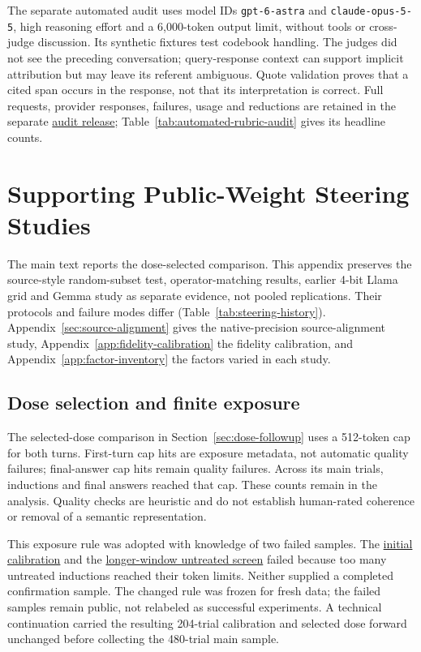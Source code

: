 \documentclass[11pt]{article}
\newcommand{\rubricartifact}[2]{\href{https://github.com/tdj28/llm_selfref_pre/blob/fdb6d15782b964b40f0be7d6528cf47d5fc0b140/#1}{#2}}
\begin{document}
The separate automated audit uses model IDs \texttt{gpt-6-astra} and
\texttt{claude-opus-5-5}, high reasoning effort and a 6,000-token output
limit, without tools or cross-judge discussion. Its \RubricAuditPilotN{}
synthetic fixtures test codebook handling. The judges did not
see the preceding conversation; query-response context can support implicit
attribution but may leave its referent ambiguous. Quote validation proves
that a cited span occurs in the response, not that its interpretation is
correct. Full requests, provider responses, failures, usage and reductions
are retained in the separate
\rubricartifact{data/automated_rubric_audit/v1_20260929/release_manifest.json}{audit release};
Table~\ref{tab:automated-rubric-audit} gives its headline counts.
\FloatBarrier

\section{Supporting Public-Weight Steering Studies}
\label{app:legacy-steering}

The main text reports the dose-selected comparison. This appendix preserves
the source-style random-subset test, operator-matching results, earlier
4-bit Llama grid and Gemma study as separate evidence, not pooled
replications. Their protocols and failure modes differ
(Table~\ref{tab:steering-history}). Appendix~\ref{sec:source-alignment}
gives the native-precision source-alignment study,
Appendix~\ref{app:fidelity-calibration} the fidelity calibration, and
Appendix~\ref{app:factor-inventory} the factors varied in each study.

\subsection{Dose selection and finite exposure}
\label{app:dose-exposure}

The selected-dose comparison in Section~\ref{sec:dose-followup} uses a
512-token cap for both turns. First-turn cap hits are exposure metadata,
not automatic quality failures; final-answer cap hits remain quality
failures. Across its \DoseMainTrials{} main trials,
\DoseFollowupInductionCaps{} inductions and \DoseFollowupFinalCaps{} final
answers reached that cap. These counts remain in the analysis. Quality
checks are heuristic and do not establish human-rated coherence or removal
of a semantic representation.

This exposure rule was adopted with knowledge of two failed samples. The
\href{https://github.com/tdj28/llm_selfref_pre/tree/d90abef11a1d3776ae2417687b56aa85e8ead5f5/data/berg_dose_ladder/calibration_v1_20261004}{initial calibration}
and the
\href{https://github.com/tdj28/llm_selfref_pre/tree/0df8cc316b073fca463912ecabb61434511ad238/data/berg_dose_window/zero_screen_v1_20261004}{longer-window untreated screen}
failed because too many untreated inductions reached their token limits.
Neither supplied a completed confirmation sample. The changed rule was
frozen for fresh data; the failed samples remain public, not relabeled as
successful experiments. A technical continuation carried the resulting
204-trial calibration and selected dose forward unchanged before collecting
the 480-trial main sample.
\end{document}
